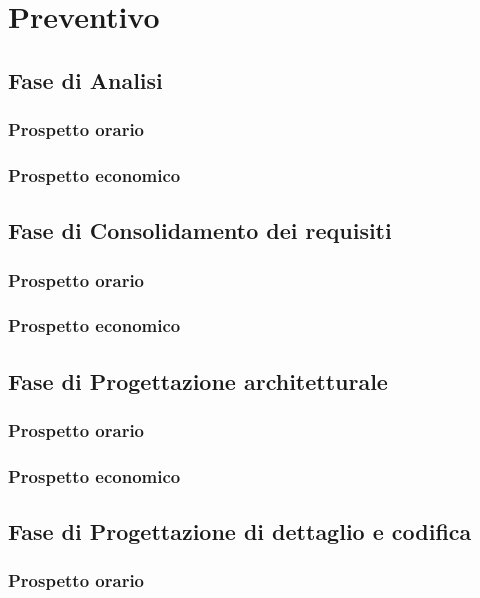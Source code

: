 \section{Preventivo}

\subsection{Fase di Analisi}
\subsubsection{Prospetto orario}

\subsubsection{Prospetto economico}

\subsection{Fase di Consolidamento dei requisiti}
\subsubsection{Prospetto orario}

\subsubsection{Prospetto economico}

\subsection{Fase di Progettazione architetturale}
\subsubsection{Prospetto orario}

\subsubsection{Prospetto economico}

\subsection{Fase di Progettazione di dettaglio e codifica}
\subsubsection{Prospetto orario}

